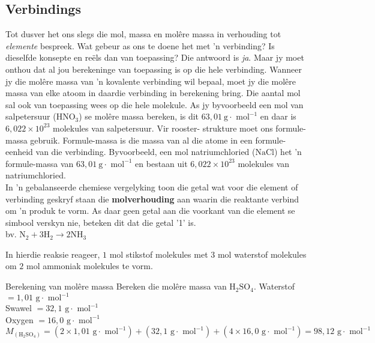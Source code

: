             \subsection*{Verbindings}
            \nopagebreak
Tot dusver het ons slegs die mol, massa en mol\^{e}re massa in verhouding tot \textsl{elemente} bespreek. Wat gebeur as ons te doene het met 'n verbinding? Is dieselfde konsepte en re\"{e}ls dan van toepassing? Die antwoord is \textsl{ja}. Maar jy moet onthou dat al jou berekeninge van toepassing is op die hele verbinding. Wanneer jy die mol\^{e}re massa van 'n kovalente verbinding wil bepaal, moet jy die mol\^{e}re massa van elke atoom in daardie verbinding in berekening bring. Die aantal mol sal ook van toepassing wees op die hele molekule. As jy byvoorbeeld een mol van salpetersuur ($\text{HNO}_{3}$) se molêre massa bereken, is dit $63,01~\text{g}\cdot{\text{ mol}}^{-1}$ en daar is $6,022 \times 10^{23}$ molekules van salpetersuur. Vir rooster- strukture moet ons formule-massa gebruik. Formule-massa is die massa van al die atome in een formule-eenheid van die verbinding. Byvoorbeeld, een mol natriumchloried ($\text{NaCl}$) het 'n formule-massa van  $63,01~\text{g}\cdot{\text{ mol}}^{-1}$ en bestaan uit $6,022 \times 10^{23}$ molekules van natriumchloried.\\
In 'n gebalanseerde chemiese vergelyking toon die getal wat voor die element of verbinding geskryf staan die \textbf{molverhouding} aan  waarin die reaktante verbind om 'n produk te vorm. As daar geen getal aan die voorkant van die element se simbool verskyn nie, beteken dit dat die getal '1' is.\\
      \label{m38717*id278442}bv. ${\text{N}}_{2}+3{\text{H}}_{2}\to 2\text{N}{\text{H}}_{3}$\par 
      \label{m38717*id278488}In hierdie reaksie reageer, $1$ mol stikstof molekules met $3$ mol waterstof molekules om $2$ mol  ammoniak molekules te vorm.
\label{m38717*secfhsst!!!underscore!!!id566}
      \begin{wex}{Berekening van mol\^{e}re massa}{
      \label{m38717*probfhsst!!!underscore!!!id567}
      \label{m38717*id278505}Bereken die molêre massa van $\text{H}_{2}\text{SO}_{4}$.
      }
{
Waterstof $=1,01 \text{ g} \cdot \text{ mol}^{-1}$ \\ 
Swawel $=32,1\text{ g} \cdot \text{ mol}^{-1}$ \\
Oxygen $=16,0 \text{ g} \cdot \text{ mol}^{-1}$ 
      \label{m38717*id278632}\nopagebreak\noindent{}
    \begin{equation*}
    {M}_{(\text{H}_{2}\text{SO}_{4})}=(2 \times 1,01 \text{ g} \cdot \text{ mol}^{-1}) + (32,1 \text{ g} \cdot \text{ mol}^{-1}) + (4 \times 16,0 \text{ g} \cdot \text{ mol}^{-1} ) = 98,12 \text{ g} \cdot \text{ mol}^{-1}
      \end{equation*}
}
    \end{wex}
    \noindent


